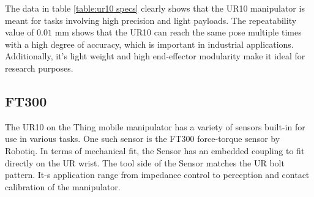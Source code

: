 \documentclass[times, utf8, diplomski, english]{fer}
\begin{document}
The data in table \ref{table:ur10 specs} clearly shows that the UR10 manipulator is meant for tasks involving high precision and light payloads. 
The repeatability value of $0.01$ mm shows that the UR10 can reach the same pose multiple times with a high degree of accuracy, which is important in industrial applications.
Additionally, it's light weight and high end-effector modularity make it ideal for research purposes.

\subsection{FT300}
The UR10 on the Thing mobile manipulator has a variety of sensors built-in for use in various tasks.
One such sensor is the FT300 force-torque sensor by Robotiq.
In terms of mechanical fit, the Sensor has an embedded coupling to fit directly on the UR wrist. The tool side of the Sensor matches the UR bolt pattern. 
It-s application range from impedance control to perception and contact calibration of the manipulator.
\end{document}
